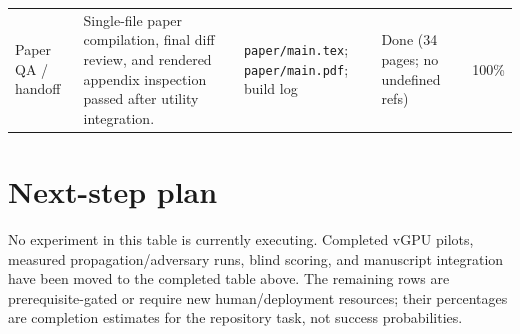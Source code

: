 \documentclass[11pt]{article}
\begin{document}
\begin{longtable}{p{}p{}p{}p{}p{}}
Paper QA / handoff & Single-file paper compilation, final diff review, and rendered appendix inspection passed after utility integration. & \texttt{paper/main.tex}; \texttt{paper/main.pdf}; build log & Done (34 pages; no undefined refs) & 100\% \\
\end{longtable}

\section*{Next-step plan}

No experiment in this table is currently executing. Completed vGPU pilots,
measured propagation/adversary runs, blind scoring, and manuscript integration
have been moved to the completed table above. The remaining rows are
prerequisite-gated or require new human/deployment resources; their percentages
are completion estimates for the repository task, not success probabilities.
\end{document}
